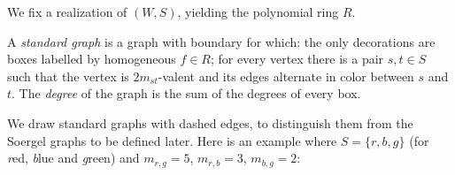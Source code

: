We fix a realization of $(W,S)$, yielding the polynomial ring $R$.

\begin{defn} A \emph{standard graph} is a graph with boundary for which: the only decorations are boxes labelled by homogeneous $f \in R$; for every vertex there is a pair $s,t \in S$
such that the vertex is $2m_{st}$-valent and its edges alternate in color between $s$ and $t$. The \emph{degree} of the graph is the sum of the degrees of every box. \end{defn}

We draw standard graphs with dashed edges, to distinguish them from the Soergel graphs to be defined later. Here is an example where $S=\{r,b,g\}$ (for \emph{r}ed, \emph{b}lue and \emph{g}reen) and $m_{r,g}=5$, $m_{r,b}=3$, $m_{b,g}=2$:



